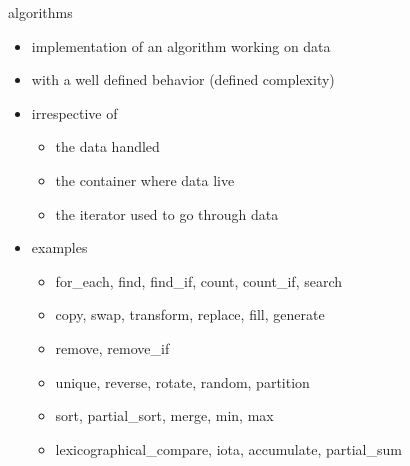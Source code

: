 \begin{frame}[fragile]
  \begin{block}{algorithms}
    \begin{itemize}
    \item implementation of an algorithm working on data
    \item with a well defined behavior (defined complexity)
    \item irrespective of
      \begin{itemize}
      \item the data handled
      \item the container where data live
      \item the iterator used to go through data
      \end{itemize}
    \item examples
      \begin{itemize}
      \item for\_each, find, find\_if, count, count\_if, search
      \item copy, swap, transform, replace, fill, generate
      \item remove, remove\_if
      \item unique, reverse, rotate, random, partition
      \item sort, partial\_sort, merge, min, max
      \item lexicographical\_compare, iota, accumulate, partial\_sum
      \end{itemize}
    \end{itemize}
  \end{block}
\end{frame}

